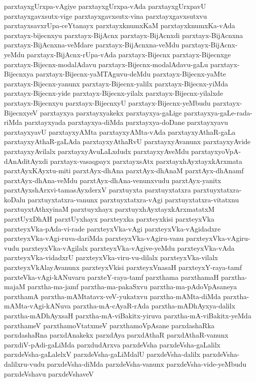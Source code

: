 {parxtayxgUrxpa-vAgiye
parxtayxgUrxpa-vAda
parxtayxgUrxpavU
parxtayxgavxsutx-vige
parxtayxgavxsutx-vina
parxtayxgavxsutxvu
parxtayxsavxrUpa-ceYtanayx
parxtayxknumxKaM
parxtayxknumxKa-vAda
parxtayx-bijecnxyu
parxtayx-BijAcnx
parxtayx-BijAcnxdi
parxtayx-BijAcnxna
parxtayx-BijAcnxna-veMdare
parxtayx-BijAcnxna-veMdu
parxtayx-BijAcnx-yeMdu
parxtayx-BijAcnx-rUpa-vAda
parxtayx-Bijecnx
parxtayx-Bijecnxge
parxtayx-Bijecnx-modalAdavu
parxtayx-Bijecnx-modalAdavu-gaLu
parxtayx-Bijecnxya
parxtayx-Bijecnx-yaMTAguvu-deMdu
parxtayx-Bijecnx-yaMte
parxtayx-Bijecnx-yanunx
parxtayx-Bijecnx-yalilx
parxtayx-Bijecnx-yiMda
parxtayx-Bijecnx-yide
parxtayx-Bijecnx-yilalx
parxtayx-Bijecnx-yilalxde
parxtayx-Bijecnxyu
parxtayx-BijecnxyU
parxtayx-Bijecnx-yeMbudu
parxtayx-BijecnxyeV
parxtayxya
parxtayxyakekx
parxtayxya-gaLige
parxtayxya-gaLe-rada-riMda
parxtayxyada
parxtayxya-diMda
parxtayxya-doDane
parxtayxyavu
parxtayxyavU
parxtayxyAMta
parxtayxyAMta-vAda
parxtayxyAthaR-gaLa
parxtayxyAthaR-gaLAda
parxtayxyAthaRvU
parxtayxyAvanunx
parxtayxyAvide
parxtayxyAvilalx
parxtayxyAvuLaLxdudx
parxtayxyAveMdu
parxtayxyoVpA-dAnAditAyxdi
parxtayx-vasaqpayx
parxtayxsAtx
parxtayxhAyxtayxkArxmata
parxtAyxKAyxtu-miti
parxtAyx-dhAna
parxtAyx-dhAnaM
parxtAyx-dhAnamf
parxtAyx-dhAna-veMdu
parxtAyx-dhAna-venunxvudu
parxtAyx-yanitx
parxtAyxshArxvi-tamasAyxderxV
parxtuyxta
parxtuyxtatxra
parxtuyxtatxra-koDalu
parxtuyxtatxra-vanunx
parxtuyxtatxra-vAgi
parxtuyxtatxra-vitatxnu
parxtuyxtAthxyinaM
parxtuyxhayx
parxtuyxhAyxtayxkArxmatatxM
parxtUyxDhAH
parxtUyxhayx
parxteyxka
parxteyxkisi
parxteyxVka
parxteyxVka-pAda-vi-rade
parxteyxVka-vAgi
parxteyxVka-vAgidadxre
parxteyxVka-vAgi-ruva-dariMda
parxteyxVka-vAgiru-vanu
parxteyxVka-vAgiru-vudu
parxteyxVka-vAgilalx
parxteyxVka-vAgive-yeMdu
parxteyxVka-vAda
parxteyxVka-vidadxrU
parxteyxVka-viru-vu-dilalx
parxteyxVka-vilalx
parxteyxVkAlayAvanunx
parxteyxVkisi
parxteyxVnasaH
parxteyxY-raya-tamf
parxteVka-vAgi-kANuvaru
parxteY-raya-tamf
parxthama
parxthamaH
parxtha-majaM
parxtha-ma-jamf
parxtha-ma-pakaSxvu
parxtha-ma-pAdoVpAsaneya
parxthamA
parxtha-mAMtatavx-veV-yukatxvu
parxtha-mAMta-diMda
parxtha-mAMta-vAgi-kANuva
parxtha-mA-cAyaR-rAda
parxtha-mADhAyxya-dalilx
parxtha-mADhAyxsaH
parxtha-mA-viBakitx-yiruva
parxtha-mA-viBakitx-yeMda
parxthameV
parxthamoVtatxmeV
parxthamoVpAsane
parxdashaRka
parxdashaRna
parxdAnakekx
parxdAya
parxdAthaR
parxdAthaR-vanunx
parxdiV-pAdi-gaLiMda
parxdudArxva
parxdeVsha
parxdeVsha-gaLalilx
parxdeVsha-gaLalelxV
parxdeVsha-gaLiMdalU
parxdeVsha-dalilx
parxdeVsha-dalilxru-vudu
parxdeVsha-diMda
parxdeVsha-vanunx
parxdeVsha-vide-yeMbudu
parxdeVshavu
parxdeVshaveV
}

